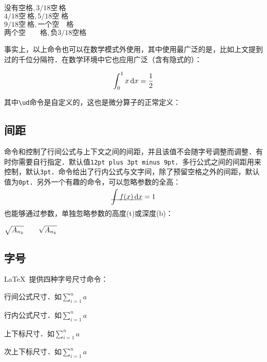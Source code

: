 \begin{codeshow}
  $没有空格,3/18空\,格$ \\
  $4/18空\:格,5/18空\;格$ \\
  $9/18空\ 格,一个空\quad 格$ \\
  $两个空\qquad 格,负3/18空\!格$
\end{codeshow}

事实上，以上命令也可以在数学模式外使用，其中使用最广泛的是\latexline{,}，比如上文提到过的千位分隔符．在数学环境中它也应用广泛（含有隐式的\latexline{,}）：

\begin{codeshow}
\[ \int_0^1 x \ud{}x
= \frac{1}{2} \]
\end{codeshow}

其中\verb|\ud|命令是自定义的，这也是微分算子的正常定义\label{cmd:ud}：
\begin{latex}
\newcommand{\ud}{\mathop{}\negthinspace\mathrm{d}}
\end{latex}

\subsection{间距}
命令和控制了行间公式与上下文之间的间距，并且该值不会随字号调整而调整．有时你需要自行指定．默认值\texttt{12pt plus 3pt minus 9pt}．多行公式之间的间距用来控制，默认\texttt{3pt}．命令给出了行内公式与文字间，除了预留空格之外的间距，默认值为\texttt{0pt}．另外一个有趣的命令，可以忽略参数的全高：
\begin{codeshow}
\[\underline{\smash{\int f(x)\ud x}}=1\]
\end{codeshow}

也能够通过参数，单独忽略参数的高度(t)或深度(b)：
\begin{codeshow}
$\sqrt{A_{n_k}} \qquad
\sqrt{\smash[b]{A_{n_k}}}$
\end{codeshow}

\subsection{字号}
\LaTeX\ 提供四种字号尺寸命令：
\begin{para}
\item[\latexline{displaystyle}] 行间公式尺寸．如$\displaystyle \sum_{i=1}^n a$
\item[\latexline{textstyle}] 行内公式尺寸．如$\textstyle \sum_{i=1}^n a$
\item[\latexline{scriptstyle}] 上下标尺寸．如$\scriptstyle \sum_{i=1}^n a$
\item[\latexline{scriptscriptstyle}] 次上下标尺寸．如$\scriptscriptstyle \sum_{i=1}^n a$
\end{para}

